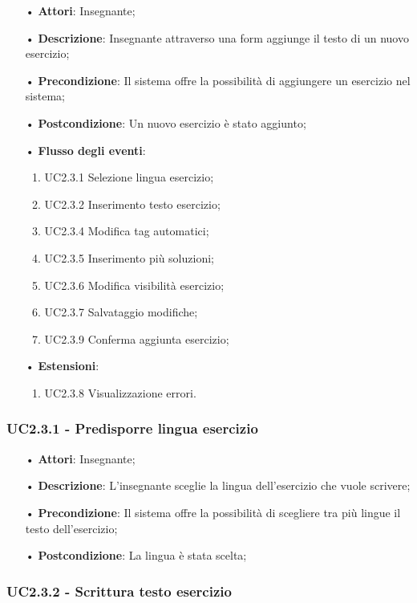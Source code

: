 \begin{itemize}
	\item[•] \textbf{Attori}: Insegnante;
	\item[•] \textbf{Descrizione}: Insegnante attraverso una form aggiunge il testo di un nuovo esercizio;
	\item[•] \textbf{Precondizione}: Il sistema offre la possibilità di aggiungere un esercizio nel sistema;
	\item[•] \textbf{Postcondizione}: Un nuovo esercizio è stato aggiunto;
	\item[•] \textbf{Flusso degli eventi}:
	\begin{enumerate}
		\item UC2.3.1 Selezione lingua esercizio;
		\item UC2.3.2 Inserimento testo esercizio;
		\item UC2.3.4 Modifica tag automatici;
		\item UC2.3.5 Inserimento più soluzioni;
		\item UC2.3.6 Modifica visibilità esercizio;
		\item UC2.3.7 Salvataggio modifiche;
		\item UC2.3.9 Conferma aggiunta esercizio;
	\end{enumerate}
	\item[•] \textbf{Estensioni}:	
	\begin{enumerate}
		\item UC2.3.8 Visualizzazione errori.
	\end{enumerate}
\end{itemize}

\subsubsection{UC2.3.1 - Predisporre lingua esercizio}
\begin{itemize}
	\item[•] \textbf{Attori}: Insegnante;
	\item[•] \textbf{Descrizione}: L'insegnante sceglie la lingua dell’esercizio che vuole scrivere;
	\item[•] \textbf{Precondizione}: Il sistema offre la possibilità di scegliere tra più lingue il testo 
			dell’esercizio;
	\item[•] \textbf{Postcondizione}: La lingua è stata scelta;
\end{itemize}




\subsubsection{UC2.3.2 - Scrittura testo esercizio}

